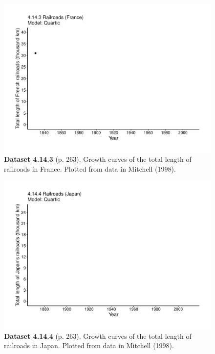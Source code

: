 \documentclass[aps,rmp,preprint,superscriptaddress,10pt,onecolumn]{article}
\begin{document}
\clearpage
\begin{figure}[h]
\includegraphics[width=\textwidth]{output/figs-ggplot/4.14.3.pdf}
\caption*{\textbf{Dataset 4.14.3} (p. 263). Growth curves of the total length of railroads in France. Plotted from data in Mitchell (1998).}
\end{figure}
	
\clearpage
\begin{figure}[h]
\includegraphics[width=\textwidth]{output/figs-ggplot/4.14.4.pdf}
\caption*{\textbf{Dataset 4.14.4} (p. 263). Growth curves of the total length of railroads in Japan. Plotted from data in Mitchell (1998).}
\end{figure}
	
\end{document}
